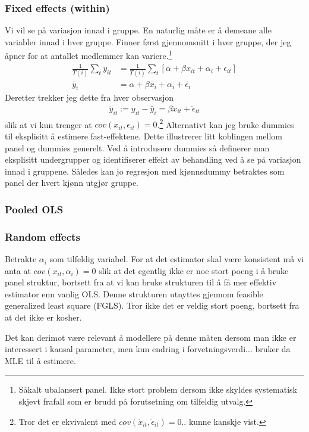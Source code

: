 \subsubsection{Fixed effects (within)}
Vi vil se på variasjon innad i gruppe. En naturlig måte er å demeane alle variabler innad i hver gruppe. Finner først gjennomsnitt i hver gruppe, der jeg åpner for at antallet medlemmer kan variere.\footnote{Såkalt ubalansert panel. Ikke stort problem dersom ikke skyldes systematisk skjevt frafall som er brudd på forutsetning om tilfeldig utvalg.}
\begin{align}
\frac{1}{T(i)}\sum_t y_{it} &= \frac{1}{T(i)}\sum_t[ \alpha + \beta x_{it}+\alpha_i+\epsilon_{it}] \\
\bar{y}_i &= \alpha + \beta \bar{x}_i + \alpha_i + \bar{\epsilon}_i
\end{align}
Deretter trekker jeg dette fra hver observasjon
\begin{align}
\ddot{y}_{it} := y_{it}-\bar{y}_i = \beta \ddot {x}_{it} + \ddot{\epsilon}_{it}
\end{align}
slik at vi kun trenger at $cov(x_{it},\epsilon_{it}) = 0$.\footnote{Tror det er ekvivalent med $cov(\ddot{x}_{it},\ddot{\epsilon}_{it}) = 0$.. kunne kanskje vist.}
Alternativt kan jeg bruke dummies til eksplisitt å estimere fast-effektene. Dette illustrerer litt koblingen mellom panel og dummies generelt. Ved å introdusere dummies så definerer man eksplisitt undergrupper og identifiserer effekt av behandling ved å se på variasjon innad i gruppene. Således kan jo regresjon med kjønnsdummy betraktes som panel der hvert kjønn utgjør gruppe. 
\subsubsection{Pooled OLS}
\subsubsection{Random effects}
Betrakte $\alpha_i$ som tilfeldig variabel. For at det estimator skal være konsistent må vi anta at $cov(x_{it},\alpha_i) = 0$ slik at det egentlig ikke er noe stort poeng i å bruke panel struktur, bortsett fra at vi kan bruke strukturen til å få mer effektiv estimator enn vanlig OLS. Denne strukturen utnyttes gjennom feasible generalized least square (FGLS). Tror ikke det er veldig stort poeng, bortsett fra at det ikke er kosher.

Det kan derimot være relevant å modellere på denne måten dersom man ikke er interessert i kausal parameter, men kun endring i forvetningsverdi... bruker da MLE til å estimere.

